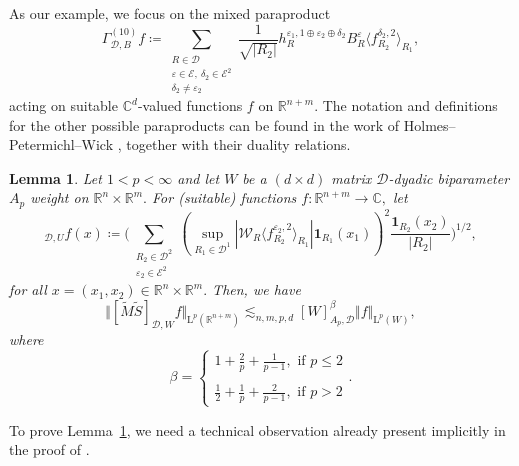 \documentclass{article}
\newtheorem{lemma}[theorem]{Lemma}
\theoremstyle{definition}
\theoremstyle{remark}
\numberwithin{equation}{section}
\newcommand{\cD}{\mathcal{D}}
\newcommand{\cE}{\mathcal{E}}
\newcommand{\cW}{\mathcal{W}}
\newcommand{\bfD}{\bm{\mathcal{D}}}
\newcommand{\e}{\varepsilon}
\newcommand{\reals}{\mathbb{R}}
\newcommand{\complex}{\mathbb{C}}
\newcommand{\Lp}[1]{\mathrm{L}^{#1}}
\newcommand{\1}{\mathbf{1}}
\begin{document}
    As our example, we focus on the mixed paraproduct
    \begin{equation*}
        \Gamma_{\bfD,B}^{(10)}f\coloneq \sum_{\substack{R\in\bfD\\\e\in\cE,~\delta_2\in\cE^2\\\delta_2\neq\e_2}}\frac{1}{\sqrt{|R_2|}}h_{R}^{\e_1,1\oplus\e_2\oplus\delta_2}B_{R}^{\e}\langle f^{\delta_2,2}_{R_2}\rangle_{R_1},
    \end{equation*}
    acting on suitable $\complex^d$-valued functions $f$ on $\reals^{n+m}.$
    The notation and definitions for the other possible paraproducts can be found in the work of Holmes--Petermichl--Wick \cite[Subsection 6.1]{Holmes_Petermichl_Wick_2018},
    together with their duality relations.
    
    \begin{lemma}
        \label{lemma:auxiliary_mixed_operator}
        Let $1<p<\infty$ and let $W$ be a $(d\times d)$ matrix $\bfD$-dyadic biparameter $A_p$ weight on $\reals^n\times\reals^m.$ For (suitable) functions $f:\reals^{n+m}\to\complex,$ let
        \begin{equation*}
            [\widetilde{M}\widetilde{S}]_{\bfD,U}f(x)\coloneq \bigg(\sum_{\substack{R_2\in\cD^2\\\e_2\in\cE^2}}(\sup_{R_1\in\cD^1}|\cW_{R}\langle f^{\e_2,2}_{R_2}\rangle_{R_1}|\1_{R_1}(x_1))^2\frac{\1_{R_2}(x_2)}{|R_2|}\bigg)^{1/2},
        \end{equation*}
        for all $x=(x_1,x_2)\in\reals^{n}\times\reals^{m}.$ Then, we have
        \begin{equation*}
            \Vert[\widetilde{M}\widetilde{S}]_{\bfD,W}f\Vert_{\Lp{p}(\reals^{n+m})}\lesssim_{n,m,p,d}[W]_{A_p,\bfD}^{\beta}\Vert f\Vert_{\Lp{p}(W)},
        \end{equation*}
        where
        \begin{equation*}
            \beta=
            \begin{cases}
                1+\frac{2}{p}+\frac{1}{p-1},\text{ if }p\leq 2\\\\
                \frac{1}{2}+\frac{1}{p}+\frac{2}{p-1},\text{ if }p>2
            \end{cases}
            .
        \end{equation*}
    \end{lemma}

    To prove Lemma~\ref{lemma:auxiliary_mixed_operator}, we need a technical observation already present implicitly in the proof of \cite[Lemma 5.3]{DKPS2024}.
\end{document}
